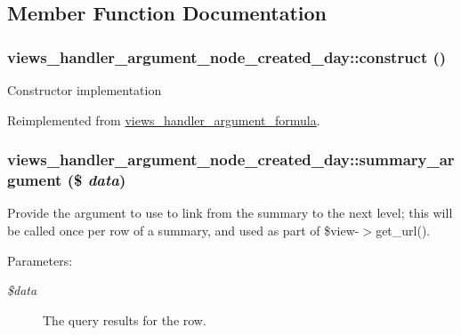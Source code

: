 \subsection{Member Function Documentation}
\hypertarget{classviews__handler__argument__node__created__day_eb33813a3cc0da642e45a12625da5bde}{
\subsubsection[{construct}]{\setlength{\rightskip}{0pt plus 5cm}views\_\-handler\_\-argument\_\-node\_\-created\_\-day::construct ()}}
\label{classviews__handler__argument__node__created__day_eb33813a3cc0da642e45a12625da5bde}


Constructor implementation 

Reimplemented from \hyperlink{classviews__handler__argument__formula_01284402427de2bcfa1b1da5792a2332}{views\_\-handler\_\-argument\_\-formula}.\hypertarget{classviews__handler__argument__node__created__day_c7f626914f87a04112962bf39d49d454}{
\subsubsection[{summary\_\-argument}]{\setlength{\rightskip}{0pt plus 5cm}views\_\-handler\_\-argument\_\-node\_\-created\_\-day::summary\_\-argument (\$ {\em data})}}
\label{classviews__handler__argument__node__created__day_c7f626914f87a04112962bf39d49d454}


Provide the argument to use to link from the summary to the next level; this will be called once per row of a summary, and used as part of \$view-$>$get\_\-url().

\begin{Desc}
\item[Parameters:]
\begin{description}
\item[{\em \$data}]The query results for the row. \end{description}
\end{Desc}



